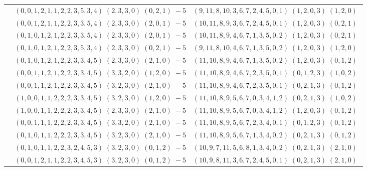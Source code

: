 \documentclass[11pt]{article}
\begin{document}
\begin{longtable}[l]{|c|c|c|}
 \cline{2-3} 
 & $(0 ,0 ,1 ,2 ,1 ,1 ,2 ,2 ,3 ,5 ,3 ,4) \;(2 ,3 ,3 ,0) \;(0 ,2 ,1) \;-5$ & $(9 ,11 ,8 ,10 ,3 ,6 ,7 ,2 ,4 ,5 ,0 ,1) \;(1 ,2 ,0 ,3) \;(1 ,2 ,0) \;$\\ 
 \cline{2-3} 
 & $(0 ,0 ,1 ,2 ,1 ,1 ,2 ,2 ,3 ,3 ,5 ,4) \;(2 ,3 ,3 ,0) \;(2 ,0 ,1) \;-5$ & $(10 ,11 ,8 ,9 ,3 ,6 ,7 ,2 ,4 ,5 ,0 ,1) \;(1 ,2 ,0 ,3) \;(0 ,2 ,1) \;$\\ 
 \cline{2-3} 
 & $(0 ,1 ,0 ,1 ,2 ,1 ,2 ,2 ,3 ,3 ,5 ,4) \;(2 ,3 ,3 ,0) \;(2 ,0 ,1) \;-5$ & $(10 ,11 ,8 ,9 ,4 ,6 ,7 ,1 ,3 ,5 ,0 ,2) \;(1 ,2 ,0 ,3) \;(0 ,2 ,1) \;$\\ 
 \cline{2-3} 
 & $(0 ,1 ,0 ,1 ,2 ,1 ,2 ,2 ,3 ,5 ,3 ,4) \;(2 ,3 ,3 ,0) \;(0 ,2 ,1) \;-5$ & $(9 ,11 ,8 ,10 ,4 ,6 ,7 ,1 ,3 ,5 ,0 ,2) \;(1 ,2 ,0 ,3) \;(1 ,2 ,0) \;$\\ 
 \cline{2-3} 
 & $(0 ,1 ,0 ,1 ,2 ,1 ,2 ,2 ,3 ,3 ,4 ,5) \;(2 ,3 ,3 ,0) \;(2 ,1 ,0) \;-5$ & $(11 ,10 ,8 ,9 ,4 ,6 ,7 ,1 ,3 ,5 ,0 ,2) \;(1 ,2 ,0 ,3) \;(0 ,1 ,2) \;$\\ 
 \cline{2-3} 
 & $(0 ,0 ,1 ,1 ,2 ,1 ,2 ,2 ,3 ,3 ,4 ,5) \;(3 ,3 ,2 ,0) \;(1 ,2 ,0) \;-5$ & $(11 ,10 ,8 ,9 ,4 ,6 ,7 ,2 ,3 ,5 ,0 ,1) \;(0 ,1 ,2 ,3) \;(1 ,0 ,2) \;$\\ 
 \cline{2-3} 
 & $(0 ,0 ,1 ,1 ,2 ,1 ,2 ,2 ,3 ,3 ,4 ,5) \;(3 ,2 ,3 ,0) \;(2 ,1 ,0) \;-5$ & $(11 ,10 ,8 ,9 ,4 ,6 ,7 ,2 ,3 ,5 ,0 ,1) \;(0 ,2 ,1 ,3) \;(0 ,1 ,2) \;$\\ 
 \cline{2-3} 
 & $(1 ,0 ,0 ,1 ,1 ,2 ,2 ,2 ,3 ,3 ,4 ,5) \;(3 ,2 ,3 ,0) \;(1 ,2 ,0) \;-5$ & $(11 ,10 ,8 ,9 ,5 ,6 ,7 ,0 ,3 ,4 ,1 ,2) \;(0 ,2 ,1 ,3) \;(1 ,0 ,2) \;$\\ 
 \cline{2-3} 
 & $(1 ,0 ,0 ,1 ,1 ,2 ,2 ,2 ,3 ,3 ,4 ,5) \;(2 ,3 ,3 ,0) \;(2 ,1 ,0) \;-5$ & $(11 ,10 ,8 ,9 ,5 ,6 ,7 ,0 ,3 ,4 ,1 ,2) \;(1 ,2 ,0 ,3) \;(0 ,1 ,2) \;$\\ 
 \cline{2-3} 
 & $(0 ,0 ,1 ,1 ,1 ,2 ,2 ,2 ,3 ,3 ,4 ,5) \;(3 ,3 ,2 ,0) \;(2 ,1 ,0) \;-5$ & $(11 ,10 ,8 ,9 ,5 ,6 ,7 ,2 ,3 ,4 ,0 ,1) \;(0 ,1 ,2 ,3) \;(0 ,1 ,2) \;$\\ 
 \cline{2-3} 
 & $(0 ,1 ,0 ,1 ,1 ,2 ,2 ,2 ,3 ,3 ,4 ,5) \;(3 ,2 ,3 ,0) \;(2 ,1 ,0) \;-5$ & $(11 ,10 ,8 ,9 ,5 ,6 ,7 ,1 ,3 ,4 ,0 ,2) \;(0 ,2 ,1 ,3) \;(0 ,1 ,2) \;$\\ 
 \cline{2-3} 
 & $(0 ,1 ,0 ,1 ,1 ,2 ,2 ,3 ,2 ,4 ,5 ,3) \;(3 ,2 ,3 ,0) \;(0 ,1 ,2) \;-5$ & $(10 ,9 ,7 ,11 ,5 ,6 ,8 ,1 ,3 ,4 ,0 ,2) \;(0 ,2 ,1 ,3) \;(2 ,1 ,0) \;$\\ 
 \cline{2-3} 
 & $(0 ,0 ,1 ,2 ,1 ,1 ,2 ,2 ,3 ,4 ,5 ,3) \;(3 ,2 ,3 ,0) \;(0 ,1 ,2) \;-5$ & $(10 ,9 ,8 ,11 ,3 ,6 ,7 ,2 ,4 ,5 ,0 ,1) \;(0 ,2 ,1 ,3) \;(2 ,1 ,0) \;$\\ 

\end{longtable}
\end{document}
